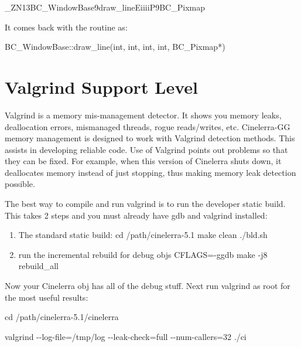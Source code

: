 \hspace{2em}\_ZN13BC\_WindowBase9draw\_lineEiiiiP9BC\_Pixmap
\smallskip

It comes back with the routine as:
\smallskip

\hspace{2em}BC\_WindowBase::draw\_line(int, int, int, int, BC\_Pixmap*)
\medskip

\section{Valgrind Support Level}
\label{sec:Valgrind Support Level}

Valgrind is a memory mis-management detector.  It shows you memory leaks, deallocation errors, mismanaged threads, rogue reads/writes, etc.  Cinelerra-GG memory management is designed to work with Valgrind detection methods.  This assists in developing reliable code.  Use of Valgrind points out problems so that they can be fixed.  For example, when this version of Cinelerra shuts down, it deallocates memory instead of just stopping, thus making memory leak detection possible.
\medskip

The best way to compile and run valgrind is to run the developer static build. This takes 2 steps and you must already have gdb and valgrind installed:
\medskip

\begin{enumerate}[nosep]
	\item The standard static build:\newline
		cd /path/cinelerra-5.1\newline
		make clean\newline
		./bld.sh
	\item run the incremental rebuild for debug objs\newline
		CFLAGS=-ggdb make -j8 rebuild\_all
\end{enumerate}
\medskip

Now your Cinelerra obj has all of the debug stuff. Next run valgrind as root for the most useful results:
\smallskip

\hspace{2em}cd /path/cinelerra-5.1/cinelerra

\hspace{2em}valgrind -{}-log-file=/tmp/log -{}-leak-check=full -{}-num-callers=32 ./ci
\medskip

